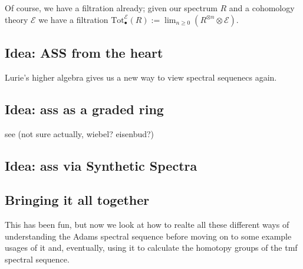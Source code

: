 Of course, we have a filtration already; given our spectrum $R$ and a cohomology theory $\mathcal{E}$ we have a filtration $\text{Tot}_\bullet^\mathcal{E}(R) := \lim_{n\geq0} \left( R^{\otimes n} \otimes \mathcal{E} \right)$. 



\newpage
\subsection{Idea: ASS from the heart}
Lurie's higher algebra \cite{HA} gives us a new way to view spectral sequenecs again. 


\subsection{Idea: ass as a graded ring}
see (not sure actually, wiebel? eisenbud?)


\subsection{Idea: ass via Synthetic Spectra}



\subsection{Bringing it all together}
This has been fun, but now we look at how to realte all these different ways of understanding the Adams spectral sequence before moving on to some example usages of it and, eventually, using it to calculate the homotopy groups of the tmf spectral sequence. 



